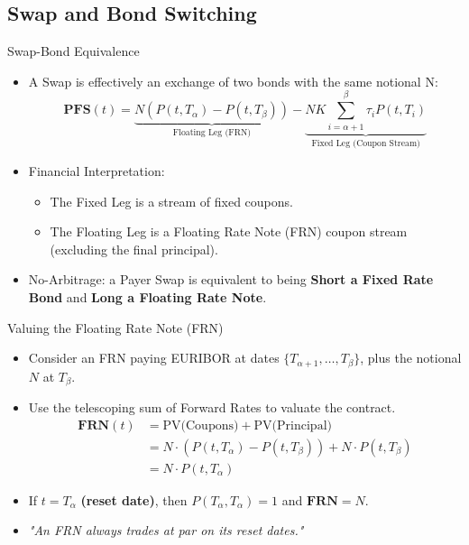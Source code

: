 \documentclass{beamer}
\begin{document}
\subsection{Swap and Bond Switching}

\begin{frame}{Swap-Bond Equivalence}
	\begin{itemize}
		\item A Swap is effectively an exchange of two bonds with the same notional N:
		\begin{equation*}
			\textbf{PFS}(t) = \underbrace{N(P(t,T_\alpha)-P(t,T_\beta))}_{\text{Floating Leg (FRN)}} - \underbrace{NK \sum_{i=\alpha+1}^{\beta} \tau_i P(t,T_i)}_{\text{Fixed Leg (Coupon Stream)}}
		\end{equation*}
		\item Financial Interpretation:
		\begin{itemize}
			\item The \textcolor{maincolor}{Fixed Leg} is a stream of fixed coupons.
			\item The \textcolor{maincolor}{Floating Leg} is a Floating Rate Note (FRN) coupon stream (excluding the final principal).
		\end{itemize}
		\item No-Arbitrage: a Payer Swap is equivalent to being \textbf{Short a Fixed Rate Bond} and \textbf{Long a Floating Rate Note}.
	\end{itemize}
\end{frame}

\begin{frame}{Valuing the Floating Rate Note (FRN)}
	\begin{itemize}
		\item Consider an FRN paying EURIBOR at dates $\{T_{\alpha+1},\ldots,T_\beta\}$, plus the notional $N$ at $T_\beta$.
		\item Use the telescoping sum of Forward Rates to valuate the contract.
		\begin{equation*}
			\begin{aligned}
				\textbf{FRN}(t) &= \text{PV(Coupons)} + \text{PV(Principal)} \\
				&= N\cdot(P(t,T_\alpha) - P(t,T_\beta)) + N\cdot P(t,T_\beta) \\
				&= \boxed{N\cdot P(t, T_\alpha)}
			\end{aligned}
		\end{equation*}
		\item If $t=T_\alpha$ \textbf{(reset date)}, then $P(T_\alpha,T_\alpha)=1$ and $\textbf{FRN}=N$.
		\item \textit{"An FRN always trades at par on its reset dates."}
	\end{itemize}
\end{frame}
\end{document}
